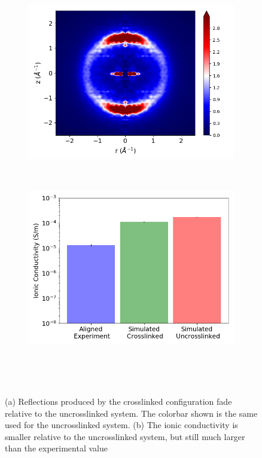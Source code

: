 \documentclass{article}
\begin{document}
  \begin{figure}
  \centering
  \begin{subfigure}{0.45\textwidth}
	\centering
	\includegraphics[width=\textwidth]{rzplot_xlink.png}
	\caption{}~\label{fig:rzplot_xlink}
  \end{subfigure}
  \begin{subfigure}{0.45\textwidth}
	\centering
	\includegraphics[width=\textwidth]{ic_xlink.png}
	\caption{}~\label{fig:ic_xlink}
  \end{subfigure}
  \caption{(a) Reflections produced by the crosslinked configuration fade relative
  to the uncrosslinked system. The colorbar shown is the same used for the uncrosslinked
  system. (b) The ionic conductivity is smaller relative to the uncrosslinked system, but
  still much larger than the experimental value}~\label{fig:xlink}
  \end{figure}
 
\end{document}
